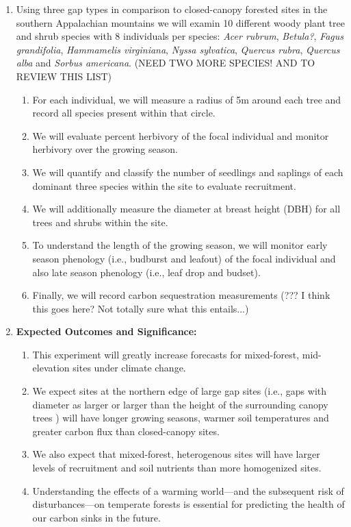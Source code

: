 \documentclass{article}\usepackage[]{graphicx}\usepackage[]{color}
\begin{document}
\begin{enumerate}
\item Using three gap types in comparison to closed-canopy forested sites in the southern Appalachian mountains we will examin 10 different woody plant tree and shrub species with 8 individuals per species: \textit{Acer rubrum}, \textit{Betula?}, \textit{Fagus grandifolia}, \textit{Hammamelis virginiana}, \textit{Nyssa sylvatica}, \textit{Quercus rubra}, \textit{Quercus alba} and \textit{Sorbus americana}. (NEED TWO MORE SPECIES! AND TO REVIEW THIS LIST)
  \begin{enumerate}
  \item For each individual, we will measure a radius of 5m around each tree and record all species present within that circle. 
  \item We will evaluate percent herbivory of the focal individual and monitor herbivory over the growing season.
  \item We will quantify and classify the number of seedlings and saplings of each dominant three species within the site to evaluate recruitment.
  \item We will additionally measure the diameter at breast height (DBH) for all trees and shrubs within the site. 
  \item To understand the length of the growing season, we will monitor early season phenology (i.e., budburst and leafout) of the focal individual and also late season phenology (i.e., leaf drop and budset).
  \item Finally, we will record carbon sequestration measurements (??? I think this goes here? Not totally sure what this entails...)
  \end{enumerate}

\item \textbf{Expected Outcomes and Significance:}
	\begin{enumerate}
	\item This experiment will greatly increase forecasts for mixed-forest, mid-elevation sites under climate change. 
	\item We expect sites at the northern edge of large gap sites (i.e., gaps with diameter as larger or larger than the height of the surrounding canopy trees \citep{Raymond2006}) will have longer growing seasons, warmer soil temperatures and greater carbon flux than closed-canopy sites. 
	\item We also expect that mixed-forest, heterogenous sites will have larger levels of recruitment and soil nutrients than more homogenized sites. 
	\item  Understanding the effects of a warming world---and the subsequent risk of disturbances---on temperate forests is essential for predicting the health of our carbon sinks in the future.
	\end{enumerate}
\end{enumerate}
\end{document}
